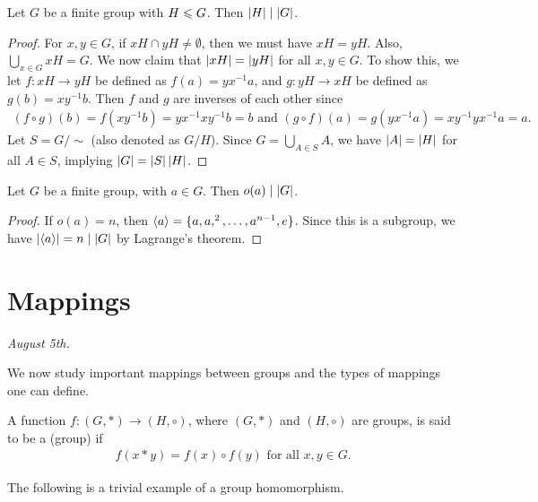 \begin{theorem}
    Let $G$ be a finite group with $H \leqslant G$. Then $\left| H \right| \mid \left| G \right|$.
\end{theorem}

\begin{proof}
    For $x,y \in G$, if $xH \cap yH \neq \emptyset$, then we must have $xH = yH$. Also, $\bigcup_{x \in G} xH = G$. We now claim that $\left| xH \right| = \left| yH \right|$ for all $x,y \in G$. To show this, we let $f:xH \to yH$ be defined as $f(a) = yx^{-1}a$, and $g:yH \to xH$ be defined as $g(b) = xy^{-1}b$. Then $f$ and $g$ are inverses of each other since
    \begin{align}
        (f \circ g)(b) = f(xy^{-1}b) = yx^{-1}xy^{-1}b = b \text{ and } (g \circ f)(a) = g(yx^{-1}a) = xy^{-1}yx^{-1}a = a.
    \end{align}
    Let $S = G/\sim$ (also denoted as $G/H$). Since $G = \bigcup_{A \in S} A$, we have $\left| A \right| = \left| H \right|$ for all $A \in S$, implying $\left| G \right| = \left| S \right| \left| H \right|$.
\end{proof}

\begin{corollary}
    Let $G$ be a finite group, with $a \in G$. Then $o(a) \mid \left| G \right|$.
\end{corollary}

\begin{proof}
    If $o(a) = n$, then $\langle a\rangle = \{a,a,^{2},\ldots,a^{n-1},e\}$. Since this is a subgroup, we have $\left| \langle a\rangle \right| = n \mid \left| G \right|$ by Lagrange's theorem.
\end{proof}

\section{Mappings}
\textit{August 5th.}

We now study important mappings between groups and the types of mappings one can define.

\begin{definition}
    A function $f:(G,\ast) \to (H,\circ)$, where $(G,\ast)$ and $(H,\circ)$ are groups, is said to be a (group)  if
    \begin{align}
        f(x \ast y) = f(x) \circ f(y) \text{ for all } x,y \in G.
    \end{align}
\end{definition}

The following is a trivial example of a group homomorphism.

